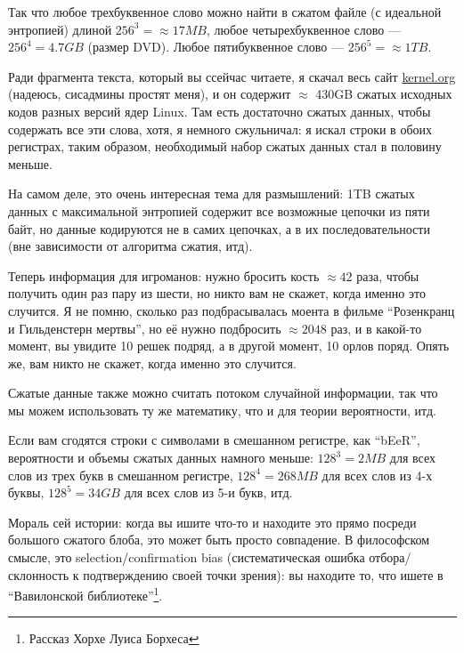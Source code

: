 Так что любое трехбуквенное слово можно найти в сжатом файле (с идеальной энтропией) длиной $256^3 = \approx 17MB$, любое четырехбуквенное слово --- $256^4 = 4.7GB$ (размер DVD).
Любое пятибуквенное слово --- $256^5 = \approx 1TB$.

Ради фрагмента текста, который вы ссейчас читаете, я скачал весь сайт \href{https://www.kernel.org/}{kernel.org} (надеюсь, сисадмины простят меня),
и он содержит $\approx$ 430GB сжатых исходных кодов разных версий ядер Linux.
Там есть достаточно сжатых данных, чтобы содержать все эти слова, хотя, я немного сжульничал: я искал строки в обоих регистрах, таким образом, необходимый набор сжатых данных стал в половину меньше.

На самом деле, это очень интересная тема для размышлений: 1TB сжатых данных с максимальной энтропией содержит все возможные цепочки из пяти байт,
но данные кодируются не в самих цепочках, а в их последовательности (вне зависимости от алгоритма сжатия, итд).

Теперь информация для игроманов: нужно бросить кость $\approx 42$ раза, чтобы получить один раз пару из шести, но никто вам не скажет, когда именно это случится.
Я не помню, сколько раз подбрасывалась моента в фильме ``Розенкранц и Гильденстерн мертвы'', но её нужно подбросить $\approx 2048$ раз, и в какой-то момент, вы увидите 10 решек подряд, а в другой момент,
10 орлов поряд.
Опять же, вам никто не скажет, когда именно это случится.

Сжатые данные также можно считать потоком случайной информации, так что мы можем использовать ту же математику, что и для теории вероятности, итд.

Если вам сгодятся строки с символами в смешанном регистре, как ``bEeR'', вероятности и объемы сжатых данных намного меньше:
$128^3=2MB$ для всех слов из трех букв в смешанном регистре,
$128^4=268MB$ для всех слов из 4-х буквы,
$128^5=34GB$ для всех слов из 5-и букв, итд.

Мораль сей истории: когда вы ишите что-то и находите это прямо посреди большого сжатого блоба, это может быть просто совпадение.
В философском смысле, это selection/confirmation bias (систематическая ошибка отбора/склонность к подтверждению своей точки зрения):
вы находите то, что ишете в ``Вавилонской библиотеке''\footnote{Рассказ Хорхе Луиса Борхеса}.

